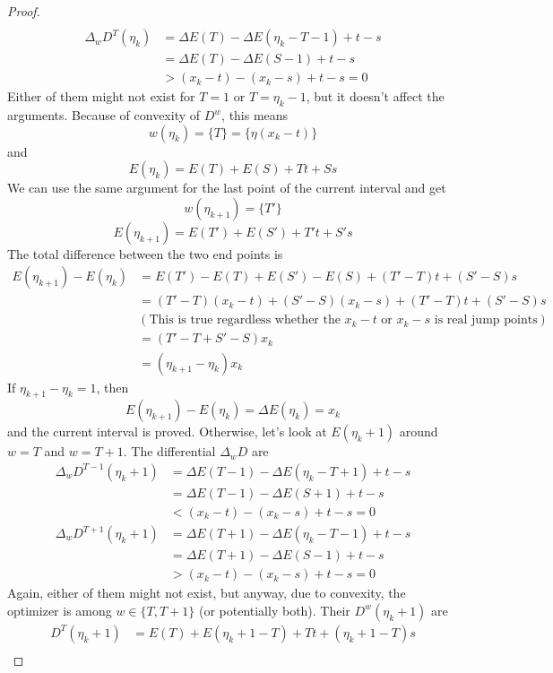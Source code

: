 \documentclass[]{article}
\begin{document}
\begin{proof}
\begin{align*}
	\end{align*}
	\begin{align*}
	\Delta_w D^{T }(\eta_k) &= \Delta E(T) - \Delta E(\eta_k - T - 1) + t - s\\
	&= \Delta E(T) - \Delta E(S - 1) + t - s\\
	&> (x_k - t) - (x_k - s) + t - s = 0
	\end{align*}
	Either of them might not exist for $T = 1$ or $T = \eta_k - 1$, but it doesn't affect the arguments. Because of convexity of $D^w$, this means 
	\[
	w(\eta_k) = \{T\} = \{\eta(x_k-t)\}
	\]
	and
	\[
	E(\eta_k) = E(T) + E(S) + T t + S s
	\]
	We can use the same argument for the last point of the current interval and get
	\[
	w(\eta_{k+1}) = \{T'\}
	\]
	\[
	E(\eta_{k+1}) = E(T') + E(S') + T' t + S' s
	\]
	The total difference between the two end points is
	\begin{align*}
	E(\eta_{k+1}) - E(\eta_k) &= E(T') - E(T) + E(S') - E(S) + (T'-T)t + (S'-S)s\\
	&= (T'-T)(x_k-t) + (S'-S)(x_k-s) + (T'-T)t + (S'-S)s \quad \\
	&(\text{This is true regardless whether the $x_k-t$ or $x_k-s$ is real jump points})\\
	&=(T'-T + S' - S)x_k\\
	&=(\eta_{k+1} -\eta_k)x_k
	\end{align*}
	If $\eta_{k+1} -\eta_k = 1$, then 
	\[
	E(\eta_{k+1}) - E(\eta_k) = \Delta E(\eta_k) = x_k
	\]
	and the current interval is proved. Otherwise, let's look at $E(\eta_k +1)$ around $w = T$ and $w = T+1$. The differential $\Delta_w D$ are
	\begin{align*}
	\Delta_w D^{T - 1}(\eta_k+1) &= \Delta E(T-1) - \Delta E(\eta_k - T + 1) + t - s\\
	&=\Delta E(T-1) - \Delta E(S + 1) + t - s\\
	&< (x_k - t) - (x_k -s) + t -s = 0
	\end{align*}
	\begin{align*}
	\Delta_w D^{T + 1}(\eta_k+1) &= \Delta E(T+1) - \Delta E(\eta_k - T - 1) + t - s\\
	&=\Delta E(T+1) - \Delta E(S - 1) + t - s\\
	&> (x_k - t) - (x_k -s) + t -s = 0
	\end{align*}
	Again, either of them might not exist, but anyway, due to convexity, the optimizer is among $w\in\{T, T+1\}$ (or potentially both). Their $D^w(\eta_k+1)$ are 
	\begin{align*}
	D^T(\eta_k+1) &= E(T) + E(\eta_k+1-T) +Tt +(\eta_k+1-T)s \\

\end{align*}
\end{proof}
\end{document}
